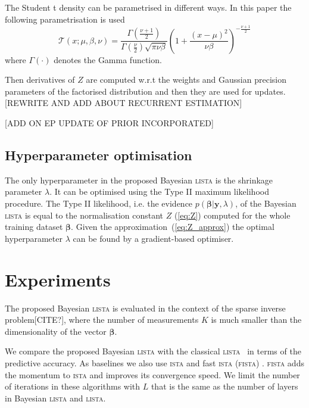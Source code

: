 \documentclass[letterpaper]{article}
\begin{document}
The Student t density can be parametrised in different ways. In this paper the following parametrisation is used 
\begin{equation}
\mathcal{T}(x; \mu, \beta, \nu) = \frac{\Gamma\left(\frac{\nu + 1}{2}\right)}{\Gamma\left(\frac{\nu}{2}\right)\sqrt{\pi \nu \beta}} \left(1 + \frac{(x - \mu)^2}{\nu\beta}\right)^{-\frac{\nu + 1}{2}}
\end{equation}
where $\Gamma(\cdot)$ denotes the Gamma function.

Then derivatives of $Z$ are computed w.r.t the weights and Gaussian precision parameters of the factorised distribution and then they are used for updates. [REWRITE AND ADD ABOUT RECURRENT ESTIMATION]

[ADD ON EP UPDATE OF PRIOR INCORPORATED]

\subsection{Hyperparameter optimisation}
The only hyperparameter in the proposed Bayesian \textsc{lista} is the shrinkage parameter $\lambda$. It can be optimised using the Type II maximum likelihood procedure. The Type II likelihood, i.e. the evidence $p(\boldsymbol\beta | \mathbf{y}, \lambda)$, of the Bayesian \textsc{lista} is equal to the normalisation constant $Z$ (\ref{eq:Z}) computed for the whole training dataset $\boldsymbol\beta$. Given the approximation~(\ref{eq:Z_approx}) the optimal hyperparameter $\lambda$ can be found by a gradient-based optimiser.

\section{Experiments}
\label{sec:experiments}
The proposed Bayesian \textsc{lista} is evaluated in the context of the sparse inverse problem[CITE?], where the number of measurements $K$ is much smaller than the dimensionality of the vector $\boldsymbol\beta$.

We compare the proposed Bayesian \textsc{lista} with the classical \textsc{lista}~\citep{gregor2010learning} in terms of the predictive accuracy. As baselines we also use \textsc{ista} \citep{daubechies2004iterative} and fast \textsc{ista} (\textsc{fista}) \citep{beck2009fast}. \textsc{fista} adds the momentum to \textsc{ista} and improves its convergence speed. We limit the number of iterations in these algorithms with $L$ that is the same as the number of layers in Bayesian \textsc{lista} and \textsc{lista}.
\end{document}
